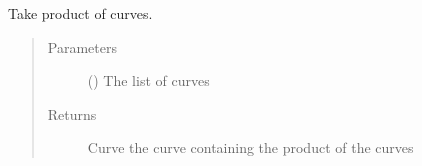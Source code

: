 \documentclass[letterpaper,10pt,english]{sphinxmanual}
\begin{document}
\begin{fulllineitems}
\label{\detokenize{pydv:pydvpy.multiply}}
Take product of curves.

\begin{sphinxVerbatim}[commandchars=\\\{\}]
  
\end{sphinxVerbatim}

\begin{sphinxVerbatim}[commandchars=\\\{\}]
  
\end{sphinxVerbatim}
\begin{quote}\begin{description}
\item[{Parameters}] \leavevmode
{} () \textendash{} The list of curves

\item[{Returns}] \leavevmode
Curve \textendash{} the curve containing the product of the curves

\end{description}\end{quote}

\end{fulllineitems}

\end{document}
